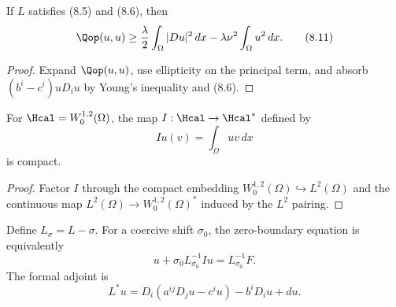 \begin{lemma}
\label{gt-lem-8-4-coercivity-estimate}
If $L$ satisfies (8.5) and (8.6), then
\begin{equation}
\Qop(u,u)\geq\frac{\lambda}{2}\int_\Omega|Du|^2\,dx
-\lambda\nu^2\int_\Omega u^2\,dx.
\tag{8.11}
\end{equation}
\end{lemma}
\begin{proof}
\sketch Expand $\Qop(u,u)$, use ellipticity on the principal term, and absorb
$(b^i-c^i)uD_iu$ by Young's inequality and (8.6).
\end{proof}

\begin{lemma}
\label{gt-lem-8-5-compact-embedding}
For $\Hcal=W_0^{1,2}(\Omega)$, the map $I:\Hcal\to\Hcal^*$ defined by
\begin{equation}
Iu(v)=\int_\Omega uv\,dx
\tag{8.12}
\end{equation}
is compact.
\end{lemma}
\begin{proof}
\sketch Factor $I$ through the compact embedding
$W_0^{1,2}(\Omega)\hookrightarrow L^2(\Omega)$ and the continuous map
$L^2(\Omega)\to W_0^{1,2}(\Omega)^*$ induced by the $L^2$ pairing.
\end{proof}

Define $L_\sigma=L-\sigma$. For a coercive shift $\sigma_0$, the zero-boundary
equation is equivalently
\begin{equation}
u+\sigma_0L_{\sigma_0}^{-1}Iu=L_{\sigma_0}^{-1}F.
\tag{8.13}
\end{equation}
The formal adjoint is
\begin{equation}
L^*u=D_i(a^{ij}D_ju-c^iu)-b^iD_iu+du.
\tag{8.14}
\end{equation}

